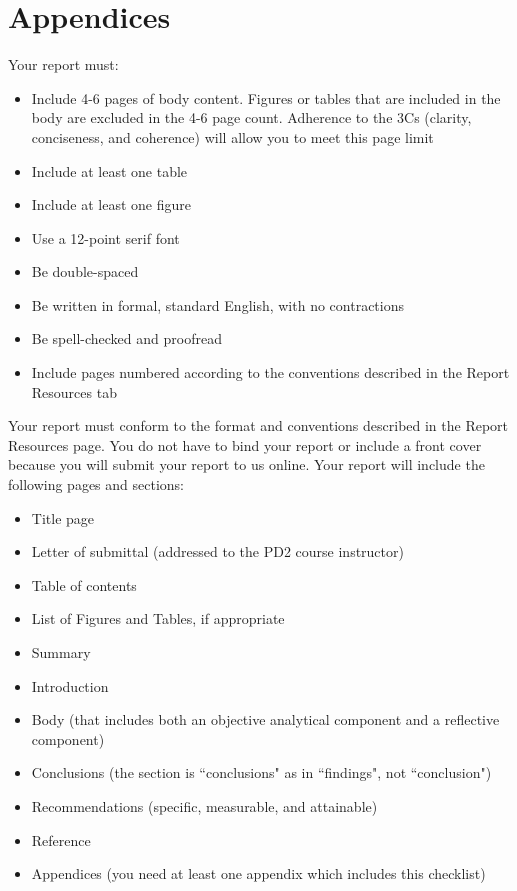 \documentclass[12pt]{report}
\begin{document}


\chapter*{Appendices}

Your report must:

\begin{itemize}[label={\checkmark}]
    \item{Include 4-6 pages of body content. Figures or tables that are included
        in the body are excluded in the 4-6 page count. Adherence to the 3Cs (clarity, conciseness, and coherence)
        will allow you to meet this page limit}
    \item{Include at least one table}
    \item{Include at least one figure}
    \item{Use a 12-point serif font}
    \item{Be double-spaced}
    \item{Be written in formal, standard English, with no contractions}
    \item{Be spell-checked and proofread}
    \item{Include pages numbered according to the conventions described in the Report Resources tab}
\end{itemize}

\noindent Your report must conform to the format and conventions described in the Report
Resources page.  You do not have to bind your report or include a front cover
because you will submit your report to us online.  Your report will include the
following pages and sections:

\begin{itemize}[label={\checkmark}]
    \item{Title page}
    \item{Letter of submittal (addressed to the PD2 course instructor)}
    \item{Table of contents}
    \item{List of Figures and Tables, if appropriate}
    \item{Summary}
    \item{Introduction}
    \item{Body (that includes both an objective analytical component and a reflective component)}
    \item{Conclusions (the section is ``conclusions" as in ``findings", not ``conclusion")}
    \item{Recommendations (specific, measurable, and attainable)}
    \item{Reference}
    \item{Appendices (you need at least one appendix which includes this checklist)}
\end{itemize}
\end{document}
